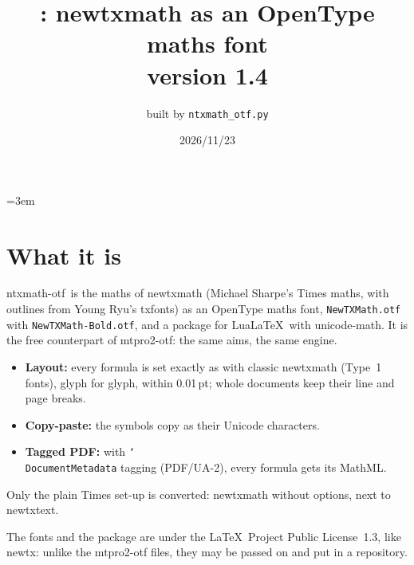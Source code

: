 \documentclass[11pt,a4paper]{article}
\title{\pkg: newtxmath as an OpenType maths font\\[2pt]\large version 1.4}
\author{built by \texttt{ntxmath\_otf.py}}
\date{2026/11/23}
\newcommand\pkg{\textsf{ntxmath-otf}}
\newcommand\cs[1]{\texttt{\char`\\#1}}
\begin{document}
\emergencystretch=3em
\maketitle

\section{What it is}
\pkg\ is the maths of \textsf{newtxmath} (Michael Sharpe's Times maths, with outlines
from Young Ryu's \textsf{txfonts}) as an OpenType maths font, \texttt{NewTXMath.otf} with
\texttt{NewTXMath-Bold.otf}, and a package for Lua\LaTeX\ with \textsf{unicode-math}. It is
the free counterpart of \textsf{mtpro2-otf}: the same aims, the same engine.
\begin{itemize}
\item \textbf{Layout:} every formula is set exactly as with classic \textsf{newtxmath}
  (Type~1 fonts), glyph for glyph, within 0.01\,pt; whole documents keep their line and page
  breaks.
\item \textbf{Copy-paste:} the symbols copy as their Unicode characters.
\item \textbf{Tagged PDF:} with \cs{DocumentMetadata} tagging (PDF/UA-2), every formula gets
  its MathML.
\end{itemize}
Only the plain Times set-up is converted: \textsf{newtxmath} without options, next to
\textsf{newtxtext}.

The fonts and the package are under the \LaTeX\ Project Public License~1.3, like
\textsf{newtx}: unlike the \textsf{mtpro2-otf} files, they may be passed on and put in a
repository.
\end{document}
